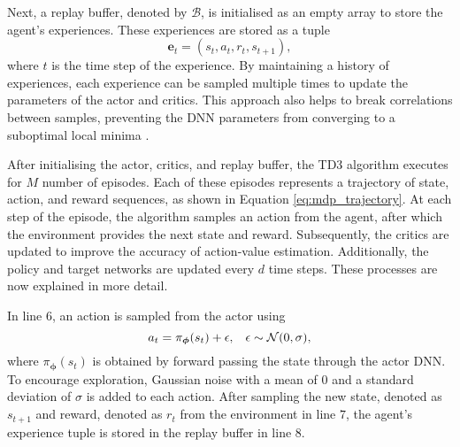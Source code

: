 Next, a replay buffer, denoted by $\mathcal{B}$, is initialised as an empty array to store the agent's experiences.
These experiences are stored as a tuple 
\begin{equation}
    \bm{e}_t = (s_t,a_t,r_t,s_{t+1}),
\end{equation}
where $t$ is the time step of the experience.
By maintaining a history of experiences, each experience can be sampled multiple times to update the parameters of the actor and critics.
This approach also helps to break correlations between samples, preventing the DNN parameters from converging to a suboptimal local minima \cite{mnih2013}.


After initialising the actor, critics, and replay buffer, the TD3 algorithm executes for $M$ number of episodes.
Each of these episodes represents a trajectory of state, action, and reward sequences, as shown in Equation \ref{eq:mdp_trajectory}.
At each step of the episode, the algorithm samples an action from the agent, after which the environment provides the next state and reward.
Subsequently, the critics are updated to improve the accuracy of action-value estimation.
Additionally, the policy and target networks are updated every $d$ time steps.
These processes are now explained in more detail.


In line $6$, an action is sampled from the actor using
\begin{equation}\label{eq:dpg_policy}
    a_t = \pi_{\bm{\phi}}(s_t) + \epsilon, \hspace{0.3cm} \epsilon \sim \mathcal{N}(0,\sigma),
\end{equation}
where $ \pi_{\bm{\phi}}(s_t)$ is obtained by forward passing the state through the actor DNN.
To encourage exploration, Gaussian noise with a mean of $0$ and a standard deviation of $\sigma$ is added to each action.
After sampling the new state, denoted as $s_{t+1}$ and reward, denoted as $r_{t}$ from the environment in line $7$, the agent's experience tuple is stored in the replay buffer in line $8$.



